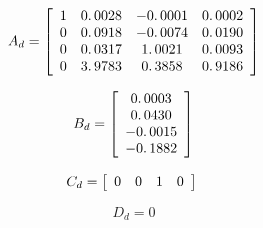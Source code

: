 \documentclass[11pt]{article}
\begin{document}
\vspace{1em}

\vspace{1em}

\begin{par}
	$$A_d =\left\lbrack \begin{array}{cccc}\linebreak 
	1 & 0\ldotp 0028 & -0\ldotp 0001 & 0\ldotp 0002\\\linebreak 
	0 & 0\ldotp 0918 & -0\ldotp 0074 & 0\ldotp 0190\\\linebreak 
	0 & 0\ldotp 0317 & 1\ldotp 0021 & 0\ldotp 0093\\\linebreak 
	0 & 3\ldotp 9783 & 0\ldotp 3858 & 0\ldotp 9186\linebreak 
	\end{array}\right\rbrack$$
\end{par}

\vspace{1em}

\begin{par}
	$$B_d =\left\lbrack \begin{array}{c}\linebreak 
	0\ldotp 0003\\\linebreak 
	0\ldotp 0430\\\linebreak 
	-0\ldotp 0015\\\linebreak 
	-0\ldotp 1882\linebreak 
	\end{array}\right\rbrack$$
\end{par}

\vspace{1em}

\begin{par}
	$$C_d =\left\lbrack \begin{array}{cccc}\linebreak 
	0 & 0 & 1 & 0\linebreak 
	\end{array}\right\rbrack \;$$
\end{par}

\vspace{1em}

\begin{par}
	$$D_d =0$$
\end{par}
\end{document}

